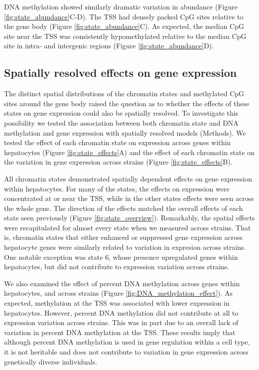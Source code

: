 \documentclass[10pt,letterpaper]{article}
\begin{document}
DNA methylation showed similarly dramatic variation in abundance (Figure
\ref{fig:state_abundance}C-D). The TSS had densely packed CpG sites
relative to the gene body (Figure \ref{fig:state_abundance}C). As
expected, the median CpG site near the TSS was consistently
hypomethylated relative to the median CpG site in intra- and intergenic
regions (Figure \ref{fig:state_abundance}D).

\hypertarget{spatially-resolved-effects-on-gene-expression}{%
\subsection{Spatially resolved effects on gene
expression}\label{spatially-resolved-effects-on-gene-expression}}

The distinct spatial distributions of the chromatin states and
methylated CpG sites around the gene body raised the question as to
whether the effects of these states on gene expression could also be
spatially resolved. To investigate this possibility we tested the
association between both chromatin state and DNA methylation and gene
expression with spatially resolved models (Methods). We tested the
effect of each chromatin state on expression across genes within
hepatocytes (Figure \ref{fig:state_effects}A) and the effect of each
chromatin state on the variation in gene expression across strains
(Figure \ref{fig:state_effects}B).

All chromatin states demonstrated spatially dependent effects on gene
expression within hepatocytes. For many of the states, the effects on
expression were concentrated at or near the TSS, while in the other
states effects were seen across the whole gene. The direction of the
effects matched the overall effects of each state seen previously
(Figure \ref{fig:state_overview}). Remarkably, the spatial effects were
recapitulated for almost every state when we measured across strains.
That is, chromatin states that either enhanced or suppressed gene
expression across hepatocyte genes were similarly related to variation
in expresion across strains. One notable exception was state 6, whose
presence upregulated genes within hepatocytes, but did not contribute to
expression variation across strains.

We also examined the effect of percent DNA methylation across genes
within hepatocytes, and across strains (Figure
\ref{fig:DNA_methylation_effect}). As expected, methylation at the TSS
was associated with lower expression in hepatocytes. However, percent
DNA methylation did not contribute at all to expression variation across
strains. This was in part due to an overall lack of variation in percent
DNA methylation at the TSS. These results imply that although percent
DNA methylation is used in gene regulation within a cell type, it is not
heritable and does not contribute to variation in gene expression across
genetically diverse individuals.
\end{document}
